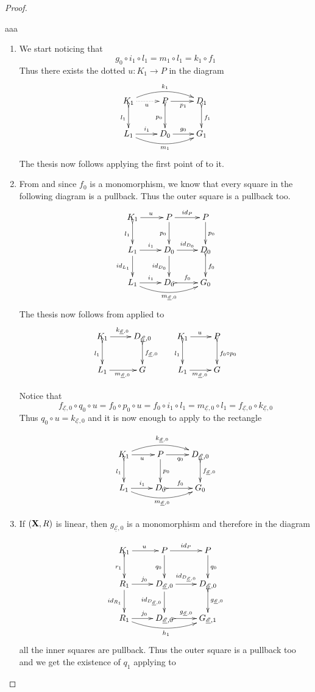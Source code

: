 \documentclass[a4paper,UKenglish,cleveref,pdftex, thm-restate,numberwithinsect]{lipics}
\newcommand{\id}[1]{\mathsf{id}_{#1}}
\def\R{\mathsf{R}}
\def\X{\textbf {\textup{X}}}
\newcommand{\dder}[1]{\mathscr{#1}}
\newcommand{\der}[1]{\underline{\dder{#1}}}
\begin{document}
\begin{proof}
	\begin{proofEnd}
		aaa
		\end{proofEnd} \qedhere 
		\begin{enumerate}
			\item We start noticing that
			\[
			g_0\circ i_1\circ l_1=m_1\circ l_1=k_1\circ f_1\] 
			Thus there exists the dotted $u\colon K_1\to P$ in the diagram
			\[\xymatrix{K_1 \ar@{>->}[d]_{l_1} \ar@{.>}[r]_{u}\ar@/^.4cm/[rr]^{k_1} &P \ar[r]_{p_1} \ar@{>->}[d]_{p_0}& D_1 \ar@{>->}[d]^{f_1}\\L_1 \ar@/_.4cm/[rr]_{m_1}\ar[r]^{i_1}& D_0 \ar[r]^{g_0}& G_1}\]
			The thesis now follows applying  the first point of  to it.
			
			
			\item From  and since $f_0$ is a monomorphism, we know that every square in the following diagram is a pullback. Thus the outer square is a pullback too.
			\[\xymatrix{K_1 \ar[r]^{u} \ar@{>->}[d]_{l_1}&P \ar[r]^{\id{P}}\ar[d]_{p_0}& P\ar[d]^{p_0}\\L_1  \ar[d]_{\id{L_1}}\ar[r]^{i_1}&D_0 \ar[r]^{\id{D_0}} \ar[d]_{\id{D_0}}& D_{0}  \ar@{>->}[d]^{f_0}\\ L_1\ar[r]^{i_1} \ar@/_.4cm/[rr]_{m_{\der{E},0}}&D_0 \ar@{>->}[r]^{f_0}&G_0}\]
		The thesis now follows from  applied to		
		\[\xymatrix{K_1 \ar@{>->}[d]_{l_1}\ar[r]^{k_{\der{E},0}}& D_{\der{E},0} \ar@{>->}[d]^{f_{\der{E},0}} & K_1 \ar[r]^{u} \ar@{>->}[d]_{l_1}& P \ar@{>->}[d]^{f_0\circ p_0}\\L_1\ar[r]_{m_{\der{E},0}}&G &L_1 \ar[r]_{m_{\der{E},0}}&G}\]
		
		Notice that
		\[f_{\der{E},0}\circ q_0\circ u=f_0\circ p_0\circ u=f_0\circ i_1\circ l_1=m_{\der{E},0}\circ l_1=f_{\der{E},0}\circ k_{\der{E},0}\]
		Thus $q_0\circ u=k_{\der{E},0}$ and  it is now enough to apply  to the rectangle
		
		\[\xymatrix{K_1 \ar@/^.4cm/[rr]^{k_{\der{E},0}} \ar@{>->}[d]_{l_1} \ar[r]_{u}& \ar[d]^{p_0} P \ar[r]_{q_0}& D_{\der{E},0} \ar@{>->}[d]^{f_{\der{E},0}}\\ L_1 \ar@/_.4cm/[rr]_{m_{\der{E},0}}\ar[r]^{i_1}& D_{0} \ar@{>->}[r]^{f_{0}}& G_0}\]

			\item If $(\X, \R)$ is linear, then $g_{\der{E},0}$ is a monomorphism and therefore in the diagram
			
						\[\xymatrix{K_1 \ar[r]^{u} \ar@{>->}[d]_{r_1}&P \ar[r]^{\id{P}}\ar[d]_{q_0}& P\ar[d]^{q_0}\\R_1  \ar[d]_{\id{R_1}}\ar[r]^{j_0}&D_{\der{E},0} \ar[r]^{\id{D_{\der{E},0}}} \ar[d]_{\id{D_{\der{E},0}}}& D_{\der{E},0} \ar@{>->}[d]^{g_{\der{E},0}}\\ R_1\ar[r]^{j_0} \ar@/_.4cm/[rr]_{h_1}&D_{\der{E},0} \ar@{>->}[r]^{g_{\der{E},0}}&G_{\der{E},1}}\]
			all the inner squares are pullback. Thus the outer square is a pullback too and we get the existence of $q_1$ applying  to
			

\end{enumerate}
\end{proof}
\end{document}
